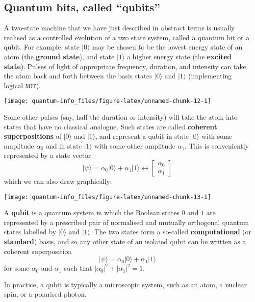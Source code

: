 \documentclass[fleqn]{article}
\newenvironment{idea}{\noindent}{\medskip}
\begin{document}
\hypertarget{quantum-bits-called-qubits}{%
\subsection{Quantum bits, called ``qubits''}\label{quantum-bits-called-qubits}}

A two-state machine that we have just described in abstract terms is usually realised as a controlled evolution of a two state system, called a quantum bit or a qubit.
For example, state \(|0\rangle\) may be chosen to be the lowest energy state of an atom (the \textbf{ground state}), and state \(|1\rangle\) a higher energy state (the \textbf{excited state}).
Pulses of light of appropriate frequency, duration, and intensity can take the atom back and forth between the basis states \(|0\rangle\) and \(|1\rangle\) (implementing logical \(\texttt{NOT}\)).

\begin{center}\texttt{[image: quantum-info\_files/figure-latex/unnamed-chunk-12-1]} \end{center}

Some other pulses (say, half the duration or intensity) will take the atom into states that have no classical analogue.
Such states are called \textbf{coherent superpositions} of \(|0\rangle\) and \(|1\rangle\), and represent a qubit in state \(|0\rangle\) with some amplitude \(\alpha_0\) and in state \(|1\rangle\) with some other amplitude \(\alpha_1\).
This is conveniently represented by a state vector
\[
    |\psi\rangle =
    \alpha_0|0\rangle + \alpha_1|1\rangle
    \leftrightarrow
    \begin{bmatrix}
      \alpha_0
    \\\alpha_1
    \end{bmatrix}
\]
which we can also draw graphically:

\begin{center}\texttt{[image: quantum-info\_files/figure-latex/unnamed-chunk-13-1]} \end{center}

\begin{idea}

A \textbf{qubit} is a quantum system in which the Boolean states \(0\) and \(1\) are represented by a prescribed pair of normalised and mutually orthogonal quantum states labelled by \(|0\rangle\) and \(|1\rangle\).
The two states form a so-called \textbf{computational} (or \textbf{standard}) basis, and so any other state of an isolated qubit can be written as a coherent superposition
\[
  |\psi\rangle = \alpha_0|0\rangle + \alpha_1|1\rangle
\]
for some \(\alpha_0\) and \(\alpha_1\) such that \(|\alpha_0|^2 + |\alpha_1|^2 = 1\).

In practice, a qubit is typically a microscopic system, such as an atom, a nuclear spin, or a polarised photon.

\end{idea}
\end{document}
